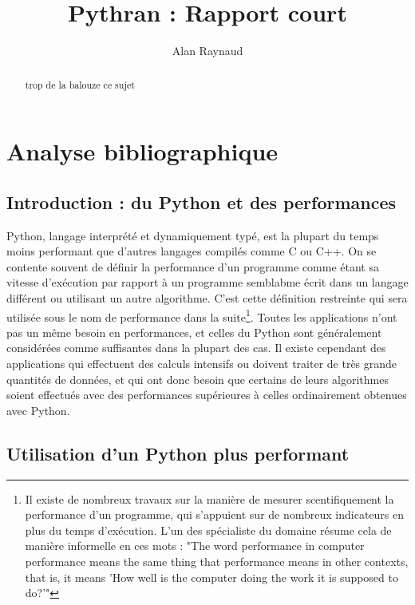 \documentclass[a4paper]{article}
\title{Pythran : Rapport court}
\author{Alan Raynaud}
\date{}
\begin{document}

\maketitle   
\begin{abstract}
    trop de la balouze ce sujet
\end{abstract}

\clearpage               

\tableofcontents            

\clearpage

\section{Analyse bibliographique}             

\subsection{Introduction : du Python et des performances}

Python, langage interprété et dynamiquement typé, est la plupart du
temps moins performant que d'autres langages compilés comme C ou
C++\cite{PythonVsCpp}. On se contente souvent de définir la
performance d'un programme comme étant sa vitesse d'exécution par
rapport à un programme semblabme écrit dans un langage différent ou
utilisant un autre algorithme. C'est cette définition restreinte qui
sera utilisée sous le nom de performance dans la suite\footnote{Il
  existe de nombreux travaux sur la manière de mesurer scentifiquement
  la performance d'un programme, qui s'appuient sur de nombreux
  indicateurs en plus du temps d'exécution. L'un des spécialiste du
  domaine résume cela de manière informelle en ces mots : "The word
  performance in computer performance means the same thing that
  performance means in other contexts, that is, it means 'How well is
  the computer doing the work it is supposed to
  do?'"\cite{Allen}}. Toutes les applications n'ont pas un même besoin
en performances, et celles du Python sont généralement considérées
comme suffisantes dans la plupart des cas. Il existe cependant des
applications qui effectuent des calculs intensifs ou doivent traiter
de très grande quantités de données, et qui ont donc besoin que
certains de leurs algorithmes soient effectués avec des performances
supérieures à celles ordinairement obtenues avec Python.

\subsection{Utilisation d'un Python plus performant}
\end{document}
